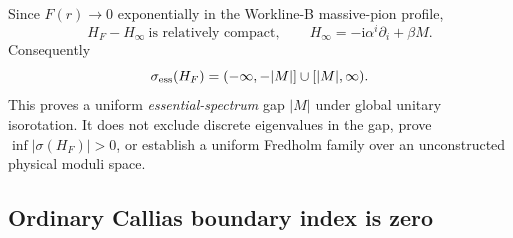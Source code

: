 \documentclass[11pt]{article}
\theoremstyle{definition}
\theoremstyle{remark}
\newcommand{\ii}{\mathrm i}
\begin{document}
Since \(F(r)\to0\) exponentially in the Workline-B massive-pion profile,
\begin{equation}
 H_F-H_\infty\ \text{is relatively compact},\qquad
 H_\infty=-\ii\alpha^i\partial_i+\beta M.
 \label{eq:relative-compact}
\end{equation}
Consequently
\begin{equation}
 \sigma_{\rm ess}(H_F)=(-\infty,-|M|]\cup[|M|,\infty).
 \label{eq:essential-spectrum}
\end{equation}
This proves a uniform \emph{essential-spectrum} gap \( |M| \) under global
unitary isorotation.  It does not exclude discrete eigenvalues in the gap,
prove \(\inf|\sigma(H_F)|>0\), or establish a uniform Fredholm family over an
unconstructed physical moduli space.

\subsection{Ordinary Callias boundary index is zero}
\end{document}
